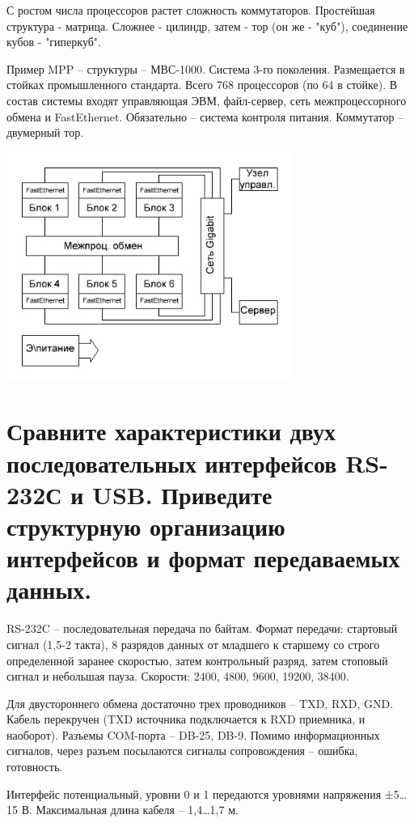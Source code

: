 \documentclass[unicode, 12pt, a4paper, oneside]{article}
\begin{document}
С ростом числа процессоров растет сложность коммутаторов. Простейшая структура - матрица. Сложнее - цилиндр, затем - тор (он же - "куб"), соединение кубов - "гиперкуб".

Пример MPP – структуры – МВС-1000. Система 3-го поколения. Размещается в стойках промышленного стандарта. Всего 768 процессоров (по 64 в стойке). В состав системы входят управляющая ЭВМ, файл-сервер, сеть межпроцессорного обмена и FastEthernet. Обязательно – система контроля питания. Коммутатор – двумерный тор.

\begin{center}
\includegraphics[width=0.7\textwidth]{118_MBC-1000.png}
\end{center}
\section{Сравните характеристики двух последовательных интерфейсов RS-232С и USB. Приведите  структурную организацию интерфейсов и формат передаваемых данных.}

RS-232C – последовательная передача по байтам. Формат передачи: стартовый сигнал (1,5-2 такта), 8 разрядов данных от младшего к старшему со строго определенной заранее скоростью, затем контрольный разряд, затем стоповый сигнал и небольшая пауза. Скорости: 2400, 4800, 9600, 19200, 38400.

Для двустороннего обмена достаточно трех проводников – TXD, RXD, GND. Кабель перекручен (TXD источника подключается к RXD приемника, и наоборот). Разъемы COM-порта – DB-25, DB-9. Помимо информационных сигналов, через разъем посылаются сигналы сопровождения – ошибка, готовность.

Интерфейс потенциальный, уровни 0 и 1 передаются уровнями напряжения ±5…15 В. Максимальная длина кабеля – 1,4…1,7 м.
\end{document}
